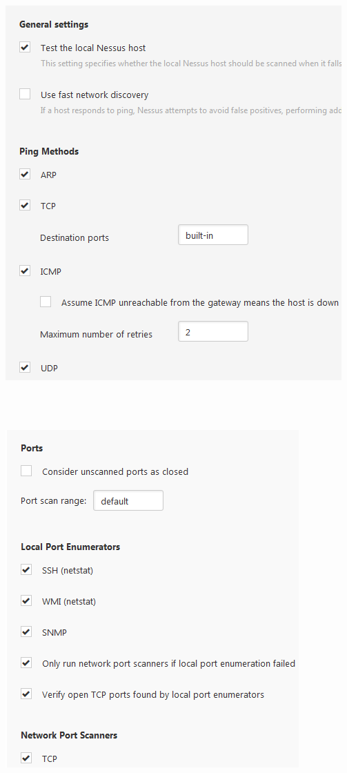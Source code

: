 \documentclass[11pt, a4paper]{article}
\begin{document}
$\;$ \\ \\
\noindent\begin{minipage}{\textwidth}
    \centering
    \includegraphics[width=\textwidth]{Nessus_5.png}
\end{minipage}
$\;$ \\ \\
\noindent\begin{minipage}{\textwidth}
    \centering
    \includegraphics{Nessus_6.png}
\end{minipage}
\end{document}
